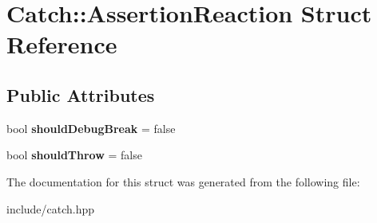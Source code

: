 \hypertarget{structCatch_1_1AssertionReaction}{}\section{Catch\+:\+:Assertion\+Reaction Struct Reference}
\label{structCatch_1_1AssertionReaction}
\subsection*{Public Attributes}
\begin{DoxyCompactItemize}
\item 
bool {\bfseries should\+Debug\+Break} = false\hypertarget{structCatch_1_1AssertionReaction_adcf30fb90ff20d9789df78d424652497}{}\label{structCatch_1_1AssertionReaction_adcf30fb90ff20d9789df78d424652497}

\item 
bool {\bfseries should\+Throw} = false\hypertarget{structCatch_1_1AssertionReaction_a82c8d95a2c1b6a331bde66982a8e090f}{}\label{structCatch_1_1AssertionReaction_a82c8d95a2c1b6a331bde66982a8e090f}

\end{DoxyCompactItemize}


The documentation for this struct was generated from the following file\+:\begin{DoxyCompactItemize}
\item 
include/catch.\+hpp\end{DoxyCompactItemize}
